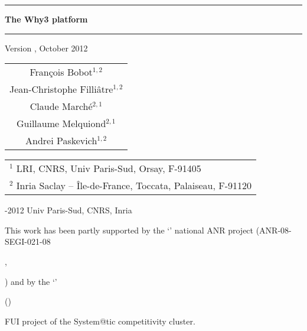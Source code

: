 \documentclass[a4paper,11pt,twoside,openright]{memoir}
\begin{document}
\sloppy

\thispagestyle{empty}

\begin{center}

\rule\textwidth{0.8mm}

\vfill

{
\fontsize{40}{40pt}\selectfont
\bfseries\sffamily The Why3 platform}

\vfill

\rule\textwidth{0.8mm}

\vfill


\begin{LARGE}
  Version \whyversion{}, October 2012
\end{LARGE}

\vfill

\begin{Large}
  \begin{tabular}{c}
  Fran\c{c}ois Bobot$^{1,2}$ \\
  Jean-Christophe Filli\^atre$^{1,2}$  \\
  Claude March\'e$^{2,1}$ \\
  Guillaume Melquiond$^{2,1}$\\
  Andrei Paskevich$^{1,2}$
\end{tabular}
\end{Large}
\vfill

\begin{flushleft}

\begin{tabular}{l}
$^1$ LRI, CNRS, Univ Paris-Sud, Orsay, F-91405 \\
$^2$ Inria Saclay -- \^Ile-de-France, Toccata, Palaiseau, F-91120
\end{tabular}

\bigskip

  -2012 Univ Paris-Sud, CNRS, Inria


  This work has been partly supported by the `'
  national ANR project (ANR-08-SEGI-021-08\begin{latexonly},
  \urlutcat\end{latexonly}) and by the `'
  \begin{latexonly}(\urlhilite)\end{latexonly} FUI project of the
  System@tic competitivity cluster.

\end{flushleft}
\end{center}
\end{document}
